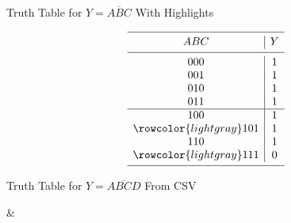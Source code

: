 \documentclass[letterpaper,11pt]{article}
\begin{document}
\begin{table} %
      \caption{Truth Table for $Y = \overline{ABC}$ With Highlights} %
     $$ 
         \begin{array}{c|c}
            \hline
            \noalign{\smallskip}
                                ABC & Y \\
            \noalign{\smallskip}
            \hline
            \noalign{\smallskip}
								000 & 1 \\
								001 & 1 \\
								010 & 1 \\
								011 & 1 \\
			\hline
								100 & 1 \\
			\rowcolor{lightgray}101 & 1\\
								110 & 1 \\
			\rowcolor{lightgray}111 & 0 \\
            \noalign{\smallskip}
            \hline
         \end{array}
     $$ 
\end{table}

\begin{table}
      \caption{Truth Table for $Y = \overline{ABCD}$ From CSV} %
    	{}
    	{\csvcoli & \csvcolii} %
\end{table}
\end{document}
